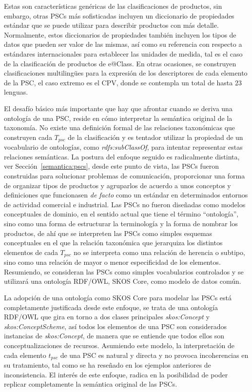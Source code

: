 Estas son características genéricas de las clasificaciones de productos, sin
embargo, otras PSCs más sofisticadas incluyen un diccionario de propiedades
estándar que se puede utilizar para describir productos con más detalle.
Normalmente, estos diccionarios de propiedades también incluyen los tipos de
datos que pueden ser valor de las mismas, así como su referencia con respecto
a estándares internacionales para establecer las unidades de medida, tal es el caso
de la clasificación de productos de e@Class. En otras ocasiones, se construyen
clasificaciones multiling\"{u}es para la expresión de los descriptores de cada
elemento de la PSC, el caso extremo es el \gls{CPV}, donde se contempla un total de hasta $23$ lenguas.

El desafío básico más importante que hay que afrontar cuando se deriva una
ontología de una PSC, reside en cómo interpretar la semántica original de la taxonomía.
No existe una definición formal de las relaciones taxonómicas que construyen
cada $T_{psc}$ de la clasificación y es tentador utilizar la propiedad de un
vocabulario de ontologías, como \textit{rdfs:subClassOf}, para intentar
representar estas relaciones semánticas. La postura del enfoque seguido es 
radicalmente distinta, ver Sección~\ref{semantica:pscs}, desde este punto de vista, las PSCs fueron construidas 
para solucionar problemas de comunicación, proporcionar una
forma de organizar tipos de productos y agruparlos de acuerdo a unos conceptos y
definiciones que funcionasen \textit{de facto} como un estándar en determinados
entornos de actividad comercial e industrial. Las PSCs no fueron diseñadas como
modelos conceptuales de dominio, en el sentido actual que tiene el término
``ontología'', sino como una forma de estructurar la terminología y la forma de
nombrar los productos, de ahí que se interpreten las PSCs como simples
esquemas conceptuales en el que la relación taxonómica que jerarquiza los
distintos elementos de cada $T_{psc}$ no se interpreta como una relación de
herencia o subtipo, sino como una relación de mayor o menor especificidad de los
elementos. Resumiendo, se consideran las PSCs como simples vocabularios
controlados y se utilizará una ontología RDF/\gls{OWL}, \gls{SKOS} Core, como modelo de
datos común.

La adopción de una ontología como SKOS Core para modelar las PSCs está
completamente justificada desde este enfoque, se trata de una ontología RDF/OWL que gira en torno a dos clases principales
\textit{skos:Concept} y \textit{skos:ConceptScheme}, así todos los elementos de una
PSC son considerados instancias de \textit{skos:Concept}, de manera que se
entiende que todos ellos son conceptualizaciones de recursos. Asumiendo este
modelo, la interpretación de cada elemento $t_{psc}$ de una PSC es natural y
directa y no provoca incoherencias en su tratamiento, tal como se ha reseñado en los ejemplos
anteriores de inconsistencia. El interés de este enfoque, radica en la posibilidad de poder 
replicar completamente la semántica original de las PSCs.

